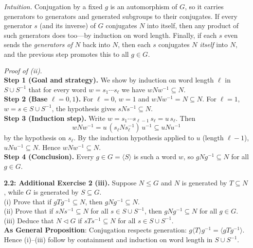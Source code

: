 \documentclass[12pt]{article}
\theoremstyle{definition}
\begin{document}
\newpage

\dotfill

\emph{Intuition.} Conjugation by a fixed $g$ is an automorphism of $G$, so it carries generators to generators and generated subgroups to their conjugates. If every generator $s$ (and its inverse) of $G$ conjugates $N$ into itself, then any product of such generators does too—by induction on word length. Finally, if each $s$ even sends the \emph{generators of $N$} back into $N$, then each $s$ conjugates \emph{$N$ itself} into $N$, and the previous step promotes this to all $g\in G$.\\

\dotfill

\emph{Proof of (ii).}\\
\textbf{Step 1 (Goal and strategy).} We show by induction on word length $\ell$ in $S\cup S^{-1}$ that for every word $w=s_1\cdots s_\ell$ we have $wNw^{-1}\subseteq N$.\\
\textbf{Step 2 (Base $\ell=0,1$).} For $\ell=0$, $w=1$ and $wNw^{-1}=N\subseteq N$. For $\ell=1$, $w=s\in S\cup S^{-1}$, the hypothesis gives $sNs^{-1}\subseteq N$.\\
\textbf{Step 3 (Induction step).} Write $w=s_1\cdots s_{\ell-1}\,s_\ell=u\,s_\ell$. Then
\[
wNw^{-1}=u\,(s_\ell N s_\ell^{-1})\,u^{-1}\subseteq uNu^{-1}
\]
by the hypothesis on $s_\ell$. By the induction hypothesis applied to $u$ (length $\ell-1$), $uNu^{-1}\subseteq N$. Hence $wNw^{-1}\subseteq N$.\\
\textbf{Step 4 (Conclusion).} Every $g\in G=\langle S\rangle$ is such a word $w$, so $gNg^{-1}\subseteq N$ for all $g\in G$.

\newpage

\noindent \textbf{2.2: Additional Exercise 2 (iii).} 
Suppose $N\le G$ and $N$ is generated by $T\subseteq N$, while $G$ is generated by $S\subseteq G$.\\
(i) Prove that if $gTg^{-1}\subseteq N$, then $gNg^{-1}\subseteq N$.\\
(ii) Prove that if $sNs^{-1}\subseteq N$ for all $s\in S\cup S^{-1}$, then $gNg^{-1}\subseteq N$ for all $g\in G$.\\
(iii) Deduce that $N\lhd G$ if $sTs^{-1}\subseteq N$ for all $s\in S\cup S^{-1}$.\\ %

\noindent\textbf{As General Proposition}: Conjugation respects generation: $g\langle T\rangle g^{-1}=\langle gTg^{-1}\rangle$. Hence (i)–(iii) follow by containment and induction on word length in $S\cup S^{-1}$.\\
\end{document}

